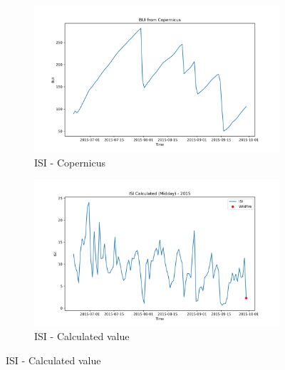 \begin{figure}[h]
	\caption{Comparison of ISI calculated values and Copernicus at midday}
	\centering
	\begin{subfigure}{0.49\textwidth}
		\centering
		\includegraphics[width=\textwidth]{graphs/2015/2015CopernicusISI12.png}
		\caption{ISI - Copernicus}
		\label{fig:isi_copernicus_2015_midday}
	\end{subfigure}
	\hfill
	\begin{subfigure}{0.49\textwidth}
		\centering
		\includegraphics[width=\textwidth]{graphs/2015/2015CalcISI12.png}
		\caption{ISI - Calculated value}
		\label{fig:isi_calculated_2015_midday}
	\end{subfigure}
	\label{fig:comparison_isi_midday_copernicus_calculated}
\end{figure}

